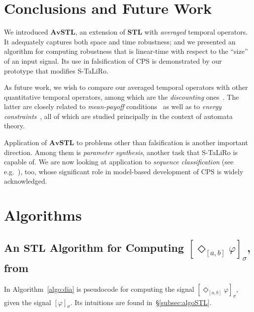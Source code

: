 \documentclass[envcountsect,orivec]{llncs} \usepackage{etex} \usepackage[]{graphicx}
\newcommand{\STL}{\textbf{STL}}
\newcommand{\DiaOp}[1]{\Diamond_{#1}}
\newcommand{\AvSTL}{\textbf{AvSTL}}
\begin{document}
\section{Conclusions and Future Work}
We introduced $\AvSTL$, an extension of $\STL$ with \emph{averaged}
temporal
operators. It adequately captures both space and time robustness; and
we presented an algorithm for computing  robustness that is 
linear-time with respect to the ``size'' of an input signal. Its use
in falsification of CPS is demonstrated by our prototype that modifies S-TaLiRo.

As future work, we wish to compare our averaged temporal operators with
other quantitative temporal operators, among which are the
\emph{discounting}
ones~\cite{DBLP:dblp_journals/jacm/AlurFH96,DBLP:conf/tacas/AlmagorBK14}. The
latter are closely related to \emph{mean-payoff}
conditions~\cite{Ehrenfeucht1979, DBLP:conf/lics/ChatterjeeHJ05} as well
as to \emph{energy
constraints}~\cite{DBLP:conf/formats/BouyerFLMS08,DBLP:conf/hybrid/BrenguierCR14},
all of which are studied principally in the context of automata theory.

Application of $\AvSTL$ to problems other than falsification is another
important direction. Among them is \emph{parameter synthesis}, another
task that S-TaLiRo is capable of.
We are now looking at application to
\emph{sequence classification} (see
e.g.~\cite{DBLP:conf/hybrid/KongJAGB14}), too,
whose significant role in model-based development of CPS is widely acknowledged.






















  


\newpage
\appendix
\section{Algorithms}
\subsection{An $\STL$ Algorithm for Computing
  $[\DiaOp{[a,b]} \varphi]_{\sigma}$, from~\cite{DBLP:conf/cav/DonzeFM13}  }
\label{appendix:algoDia}
In Algorithm~\ref{algo:dia} is pseudocode for 
computing the signal $[\DiaOp{[a,b]}\varphi]_{\sigma}$,
 given the signal $[\varphi]_{\sigma}$.
Its intuitions are found
in~\S{}\ref{subsec:algoSTL}.
\end{document}
